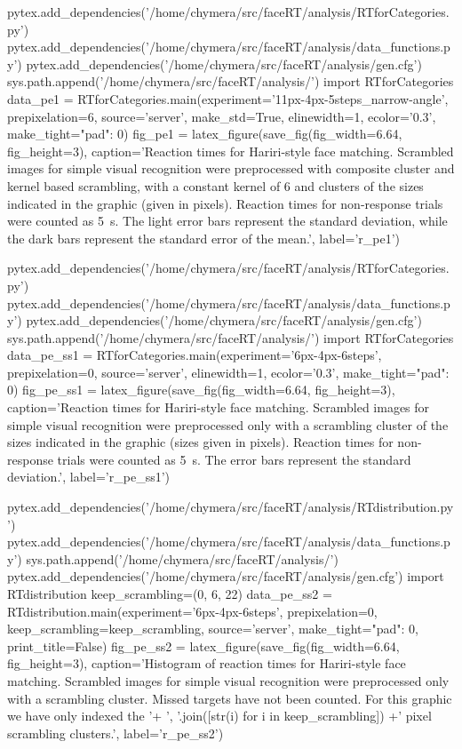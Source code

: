 \begin{pycode}[pe1]
pytex.add_dependencies('/home/chymera/src/faceRT/analysis/RTforCategories.py')
pytex.add_dependencies('/home/chymera/src/faceRT/analysis/data_functions.py')
pytex.add_dependencies('/home/chymera/src/faceRT/analysis/gen.cfg')
sys.path.append('/home/chymera/src/faceRT/analysis/')
import RTforCategories
data_pe1 = RTforCategories.main(experiment='11px-4px-5steps_narrow-angle', prepixelation=6, source='server', make_std=True, elinewidth=1, ecolor='0.3', make_tight={"pad": 0})
fig_pe1 = latex_figure(save_fig(fig_width=6.64, fig_height=3), caption='Reaction times for Hariri-style face matching. Scrambled images for simple visual recognition were preprocessed with composite cluster and kernel based scrambling, with a constant kernel of \SI{6}{\pixel} and clusters of the sizes indicated in the graphic (given in pixels). Reaction times for non-response trials were counted as \SI{5}{\second}. The light error bars represent the standard deviation, while the dark bars represent the standard error of the mean.', label='r_pe1')
\end{pycode}
\begin{pycode}[pe_ss1]
pytex.add_dependencies('/home/chymera/src/faceRT/analysis/RTforCategories.py')
pytex.add_dependencies('/home/chymera/src/faceRT/analysis/data_functions.py')
pytex.add_dependencies('/home/chymera/src/faceRT/analysis/gen.cfg')
sys.path.append('/home/chymera/src/faceRT/analysis/')
import RTforCategories
data_pe_ss1 = RTforCategories.main(experiment='6px-4px-6steps', prepixelation=0, source='server', elinewidth=1, ecolor='0.3', make_tight={"pad": 0})
fig_pe_ss1 = latex_figure(save_fig(fig_width=6.64, fig_height=3), caption='Reaction times for Hariri-style face matching. Scrambled images for simple visual recognition were preprocessed only with a scrambling cluster of the sizes indicated in the graphic (sizes given in pixels). Reaction times for non-response trials were counted as \SI{5}{\second}. The error bars represent the standard deviation.', label='r_pe_ss1')
\end{pycode}
\begin{pycode}
pytex.add_dependencies('/home/chymera/src/faceRT/analysis/RTdistribution.py')
pytex.add_dependencies('/home/chymera/src/faceRT/analysis/data_functions.py')
sys.path.append('/home/chymera/src/faceRT/analysis/')
pytex.add_dependencies('/home/chymera/src/faceRT/analysis/gen.cfg')
import RTdistribution
keep_scrambling=(0, 6, 22)
data_pe_ss2 = RTdistribution.main(experiment='6px-4px-6steps', prepixelation=0, keep_scrambling=keep_scrambling, source='server', make_tight={"pad": 0}, print_title=False)
fig_pe_ss2 = latex_figure(save_fig(fig_width=6.64, fig_height=3), caption='Histogram of reaction times for Hariri-style face matching. Scrambled images for simple visual recognition were preprocessed only with a scrambling cluster. Missed targets have not been counted. For this graphic we have only indexed the '+ ', '.join([str(i) for i in keep_scrambling]) +' pixel scrambling clusters.', label='r_pe_ss2')
\end{pycode}
